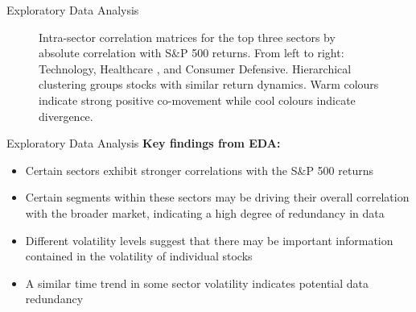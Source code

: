 \documentclass[aspectratio=43]{beamer} %
\begin{document}
\begin{frame}{Exploratory Data Analysis}
\begin{figure}[h]
    \centering
    \caption{Intra-sector correlation matrices for the top three sectors by absolute correlation with S\&P 500 returns. From left to right: Technology, Healthcare , and Consumer Defensive. Hierarchical clustering groups stocks with similar return dynamics. Warm colours indicate strong positive co-movement while cool colours indicate divergence.}
    \label{fig:top-sectors}
\end{figure}
\end{frame}

\begin{frame}{Exploratory Data Analysis}
  \textbf{Key findings from EDA:}
  \begin{itemize}
    \item Certain sectors exhibit stronger correlations with the S\&P 500 returns
    \item Certain segments within these sectors may be driving their overall correlation with the broader market, indicating a high degree of redundancy in data
    \item Different volatility levels suggest that there may be important information contained in the volatility of individual stocks 
    \item A similar time trend in some sector volatility indicates potential data redundancy
  \end{itemize}
\end{frame}
\end{document}
